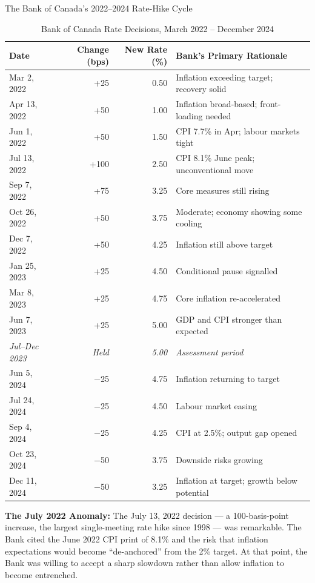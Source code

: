 \begin{casestudy}{The Bank of Canada's 2022--2024 Rate-Hike Cycle}
\begin{table}[H]
\centering
\caption{Bank of Canada Rate Decisions, March 2022 -- December 2024}
\label{tab:rate_decisions}
\renewcommand{\arraystretch}{1.25}
\begin{tabular}{lrrl}
\toprule
\textbf{Date} & \textbf{Change (bps)} & \textbf{New Rate (\%)}
              & \textbf{Bank's Primary Rationale} \\
\midrule
Mar 2, 2022  & +25  & 0.50 & Inflation exceeding target; recovery solid \\
Apr 13, 2022 & +50  & 1.00 & Inflation broad-based; front-loading needed \\
Jun 1, 2022  & +50  & 1.50 & CPI 7.7\% in Apr; labour markets tight \\
Jul 13, 2022 & +100 & 2.50 & CPI 8.1\% June peak; unconventional move \\
Sep 7, 2022  & +75  & 3.25 & Core measures still rising \\
Oct 26, 2022 & +50  & 3.75 & Moderate; economy showing some cooling \\
Dec 7, 2022  & +50  & 4.25 & Inflation still above target \\
Jan 25, 2023 & +25  & 4.50 & Conditional pause signalled \\
Mar 8, 2023  & +25  & 4.75 & Core inflation re-accelerated \\
Jun 7, 2023  & +25  & 5.00 & GDP and CPI stronger than expected \\
\midrule
\textit{Jul--Dec 2023} & \textit{Held} & \textit{5.00} & \textit{Assessment period} \\
\midrule
Jun 5, 2024  & $-$25 & 4.75 & Inflation returning to target \\
Jul 24, 2024 & $-$25 & 4.50 & Labour market easing \\
Sep 4, 2024  & $-$25 & 4.25 & CPI at 2.5\%; output gap opened \\
Oct 23, 2024 & $-$50 & 3.75 & Downside risks growing \\
Dec 11, 2024 & $-$50 & 3.25 & Inflation at target; growth below potential \\
\bottomrule
\end{tabular}
\end{table}

\textbf{The July 2022 Anomaly:} The July 13, 2022 decision --- a 100-basis-point
increase, the largest single-meeting rate hike since 1998 --- was remarkable.
The Bank cited the June 2022 CPI print of 8.1\% and the risk that
inflation expectations would become ``de-anchored'' from the 2\% target.
At that point, the Bank was willing to accept a sharp slowdown rather than
allow inflation to become entrenched.


\end{casestudy}
